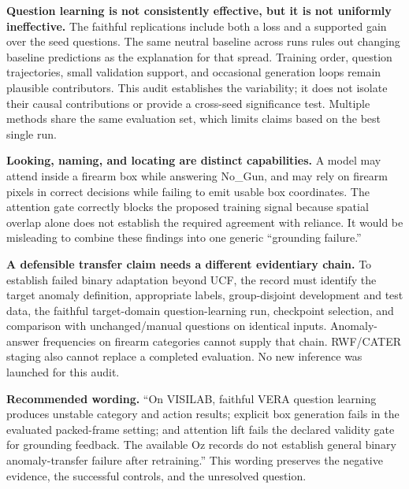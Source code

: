\documentclass[11pt]{article}
\begin{document}
\textbf{Question learning is not consistently effective, but it is not uniformly ineffective.} The faithful replications include both a loss and a supported gain over the seed questions. The same neutral baseline across runs rules out changing baseline predictions as the explanation for that spread. Training order, question trajectories, small validation support, and occasional generation loops remain plausible contributors. This audit establishes the variability; it does not isolate their causal contributions or provide a cross-seed significance test. Multiple methods share the same evaluation set, which limits claims based on the best single run.

\textbf{Looking, naming, and locating are distinct capabilities.} A model may attend inside a firearm box while answering No\_Gun, and may rely on firearm pixels in correct decisions while failing to emit usable box coordinates. The attention gate correctly blocks the proposed training signal because spatial overlap alone does not establish the required agreement with reliance. It would be misleading to combine these findings into one generic ``grounding failure.''

\textbf{A defensible transfer claim needs a different evidentiary chain.} To establish failed binary adaptation beyond UCF, the record must identify the target anomaly definition, appropriate labels, group-disjoint development and test data, the faithful target-domain question-learning run, checkpoint selection, and comparison with unchanged/manual questions on identical inputs. Anomaly-answer frequencies on firearm categories cannot supply that chain. RWF/CATER staging also cannot replace a completed evaluation. No new inference was launched for this audit.

\textbf{Recommended wording.} ``On VISILAB, faithful VERA question learning produces unstable category and action results; explicit box generation fails in the evaluated packed-frame setting; and attention lift fails the declared validity gate for grounding feedback. The available Oz records do not establish general binary anomaly-transfer failure after retraining.'' This wording preserves the negative evidence, the successful controls, and the unresolved question.
\end{document}
